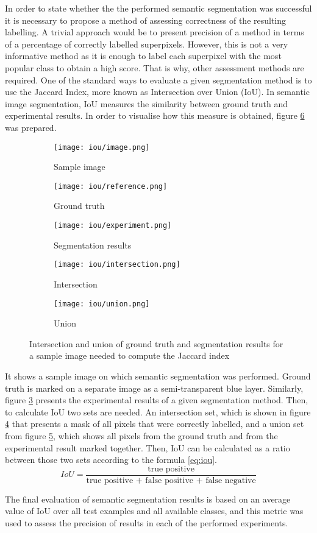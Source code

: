 In order to state whether the the performed semantic segmentation was successful it is necessary to propose a method of assessing correctness of the resulting labelling. A trivial approach would be to present precision of a method in terms of a percentage of correctly labelled superpixels. However, this is not a very informative method as it is enough to label each superpixel with the most popular class to obtain a high score. That is why, other assessment methods are required. One of the standard ways to evaluate a given segmentation method is to use the Jaccard Index\cite{IoU}, more known as Intersection over Union (IoU). In semantic image segmentation, IoU measures the similarity between ground truth and experimental results. In order to visualise how this measure is obtained, figure \ref{fig:iou_pepper_set} was prepared. 
\begin{figure}[ht]
 \centering
  \begin{subfigure}[h]{0.32\textwidth}
    \texttt{[image: iou/image.png]}
    \caption{Sample image}
    \label{fig:iou_sample_image}
  \end{subfigure}
  \begin{subfigure}[h]{0.32\textwidth}
    \texttt{[image: iou/reference.png]}
    \caption{Ground truth}
    \label{fig:iou_reference}
  \end{subfigure}
    \begin{subfigure}[h]{0.32\textwidth}
    \texttt{[image: iou/experiment.png]}
    \caption{Segmentation results}
    \label{fig:iou_experiment}
  \end{subfigure}
  \begin{subfigure}[h]{0.32\textwidth}
    \texttt{[image: iou/intersection.png]}
    \caption{Intersection}
    \label{fig:iou_intersection}
  \end{subfigure}
  \begin{subfigure}[h]{0.32\textwidth}
    \texttt{[image: iou/union.png]}
    \caption{Union}
    \label{fig:iou_union}
  \end{subfigure}
    \caption{Intersection and union of ground truth and segmentation results for a sample image needed to compute the Jaccard index}%
    \label{fig:iou_pepper_set}
\end{figure}
It shows a sample image on which semantic segmentation was performed. Ground truth is marked on a separate image as a semi-transparent blue layer. Similarly, figure \ref{fig:iou_experiment} presents the experimental results of a given segmentation method. Then, to calculate IoU two sets are needed. An intersection set, which is shown in figure \ref{fig:iou_intersection} that presents a mask of all pixels that were correctly labelled, and a union set from figure \ref{fig:iou_union}, which shows all pixels from the ground truth and from the experimental result marked together. Then, IoU can be calculated as a ratio between those two sets according to the formula \ref{eq:iou}.
\begin{equation}
    \label{eq:iou}
        IoU =\frac{\text{true positive}}{\text{true positive + false positive + false negative}} 
\end{equation}

The final evaluation of semantic segmentation results is based on an average value of IoU over all test examples and all available classes, and this metric was used to assess the precision of results in each of the performed experiments.